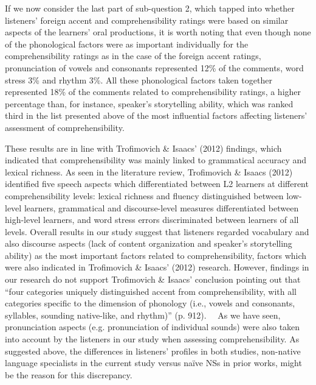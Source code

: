 \documentclass[12pt]{article}
\newenvironment{styleStandard}{\setlength\leftskip{0cm}\setlength\rightskip{0cm plus 1fil}\setlength\parindent{0cm}\setlength\parfillskip{0pt plus 1fil}\setlength\parskip{0in plus 1pt}\writerlistparindent\writerlistleftskip\leavevmode\normalfont\normalsize\writerlistlabel\ignorespaces}{\unskip\vspace{0.111in plus 0.0111in}\par}
\newcommand\writerlistleftskip{}
\newcommand\writerlistparindent{}
\newcommand\writerlistlabel{}
\begin{document}
\begin{styleStandard}
If we now consider the last part of sub-question 2, which tapped into whether listeners’ foreign accent and comprehensibility ratings were based on similar aspects of the learners’ oral productions, it is worth noting that even though none of the phonological factors were as important individually for the comprehensibility ratings as in the case of the foreign accent ratings, pronunciation of vowels and consonants represented 12\% of the comments, word stress 3\% and rhythm 3\%. All these phonological factors taken together represented 18\% of the comments related to comprehensibility ratings, a higher percentage than, for instance, speaker’s storytelling ability, which was ranked third in the list presented above of the most influential factors affecting listeners’ assessment of comprehensibility. 
\end{styleStandard}

\begin{styleStandard}
These results are in line with Trofimovich \& Isaacs’ (2012) findings, which indicated that comprehensibility was mainly linked to grammatical accuracy and lexical richness. As seen in the literature review, Trofimovich \& Isaacs (2012) identified five speech aspects which differentiated between L2 learners at different comprehensibility levels: lexical richness and fluency distinguished between low-level learners, grammatical and discourse-level measures differentiated between high-level learners, and word stress errors discriminated between learners of all levels. Overall results in our study suggest that listeners regarded vocabulary and also discourse aspects (lack of content organization and speaker’s storytelling ability) as the most important factors related to comprehensibility, factors which were also indicated in Trofimovich \& Isaacs’ (2012) research. However, findings in our research do not support Trofimovich \& Isaacs’ conclusion pointing out that “four categories uniquely distinguished accent from comprehensibility, with all categories specific to the dimension of phonology (i.e., vowels and consonants, syllables, sounding native-like, and rhythm)” (p. 912). \ \ As we have seen, pronunciation aspects (e.g. pronunciation of individual sounds) were also taken into account by the listeners in our study when assessing comprehensibility. As suggested above, the differences in listeners’ profiles in both studies, non-native language specialists in the current study versus naïve NSs in prior works, might be the reason for this discrepancy. 
\end{styleStandard}
\end{document}

